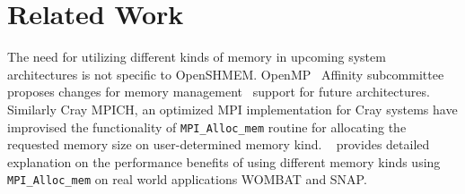 \section{Related Work}
\label{src:relate}
The need for utilizing different kinds of memory %
in upcoming system architectures is not specific to
OpenSHMEM. %
OpenMP~\cite{openmp} Affinity subcommittee proposes changes
for memory management~\cite{omp-tr5} support for future architectures.
Similarly Cray MPICH, an optimized MPI
implementation for Cray systems have improvised the functionality of
\texttt{MPI\_Alloc\_mem} routine for allocating the requested
memory size on user-determined
memory kind. ~\citeauthor{cug17-krishna}
provides detailed explanation on the performance benefits of using
different
memory kinds using \texttt{MPI\_Alloc\_mem} on real world
applications WOMBAT and SNAP.
